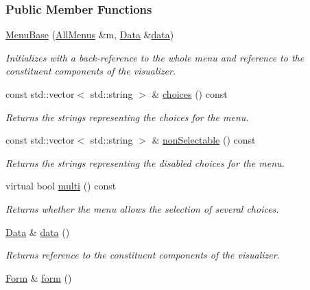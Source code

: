 \subsubsection*{Public Member Functions}
\begin{DoxyCompactItemize}
\item 
\hyperlink{structMenuBase_a07cbb1ff5860c95962bb3e4cb2ed5dd7}{Menu\+Base} (\hyperlink{structAllMenus}{All\+Menus} \&m, \hyperlink{structMenuBase_a473a45fd8adbc75a9220b64753ae3837}{Data} \&\hyperlink{structMenuBase_a819aaaa06ede3bffbb12c1390657ef64}{data})
\begin{DoxyCompactList}\small\item\em Initializes with a back-\/reference to the whole menu and reference to the constituent components of the visualizer. \end{DoxyCompactList}\item 
const std\+::vector$<$ std\+::string $>$ \& \hyperlink{structMenuBase_a0c4497b4d92f752c0d42feaa32b47702}{choices} () const 
\begin{DoxyCompactList}\small\item\em Returns the strings representing the choices for the menu. \end{DoxyCompactList}\item 
const std\+::vector$<$ std\+::string $>$ \& \hyperlink{structMenuBase_a17c85058e93c887c4b38e5da130d3b10}{non\+Selectable} () const 
\begin{DoxyCompactList}\small\item\em Returns the strings representing the disabled choices for the menu. \end{DoxyCompactList}\item 
virtual bool \hyperlink{structMenuBase_ad62b0a19c0e62d6816535e928088bb47}{multi} () const 
\begin{DoxyCompactList}\small\item\em Returns whether the menu allows the selection of several choices. \end{DoxyCompactList}\item 
\hyperlink{structMenuBase_a473a45fd8adbc75a9220b64753ae3837}{Data} \& \hyperlink{structMenuBase_a819aaaa06ede3bffbb12c1390657ef64}{data} ()
\begin{DoxyCompactList}\small\item\em Returns reference to the constituent components of the visualizer. \end{DoxyCompactList}\item 
\hyperlink{structForm}{Form} \& \hyperlink{structMenuBase_ae528359af02e83900cdae8f1fadd52a1}{form} ()

\end{DoxyCompactItemize}
